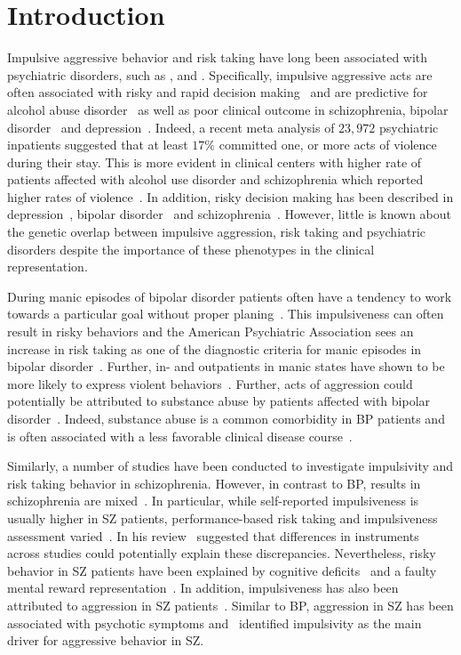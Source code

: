 \section{Introduction}
\label{sec:uk_biobank_psych_introduction}

Impulsive aggressive behavior and risk taking have long been associated with psychiatric disorders, such as ,  and .
Specifically, impulsive aggressive acts are often associated with risky and rapid decision making~\cite{Moeller2001} and are predictive for alcohol abuse disorder~\cite{Courtney2012} as well as poor clinical outcome in schizophrenia, bipolar disorder~\cite{Gut-Fayand2001} and depression~\cite{Dutton2013}.
Indeed, a recent meta analysis of $23,972$ psychiatric inpatients suggested that at least $17\%$ committed one, or more acts of violence during their stay.
This is more evident in clinical centers with higher rate of patients affected with alcohol use disorder and schizophrenia which reported higher rates of violence~\cite{Iozzino2015}. 
In addition, risky decision making has been described in depression~\cite{Wilson2010}, bipolar disorder~\cite{Johnson2012} and schizophrenia~\cite{Cheng2012}.
However, little is known about the genetic overlap between impulsive aggression, risk taking and psychiatric disorders despite the importance of these phenotypes in the clinical representation.

During manic episodes of bipolar disorder patients often have a tendency to work towards a particular goal without proper planing~\cite{Johnson2012}.
This impulsiveness can often result in risky behaviors and the American Psychiatric Association sees an increase in risk taking as one of the diagnostic criteria for manic episodes in bipolar disorder~\cite{APA1994,AmericanPsychiatricAssociation2013}.
Further, in- and outpatients in manic states have shown to be more likely to express violent behaviors~\cite{Ballester2012}.
Further, acts of aggression could potentially be attributed to substance abuse by patients affected with bipolar disorder~\cite{Fazel2010}.
Indeed, substance abuse is a common comorbidity in BP patients and is often associated with a less favorable clinical disease course~\cite{Cassidy2001}.

Similarly, a number of studies have been conducted to investigate impulsivity and risk taking behavior in schizophrenia.
However, in contrast to BP, results in schizophrenia are mixed~\cite{Reddy2014}.
In particular, while self-reported impulsiveness is usually higher in SZ patients, performance-based risk taking and impulsiveness assessment varied~\cite{Ouzir2013}.
In his review~\citet{Ouzir2013} suggested that differences in instruments across studies could potentially explain these discrepancies.
Nevertheless, risky behavior in SZ patients have been explained by cognitive deficits~\cite{Cheng2012} and a faulty mental reward representation~\cite{Heerey2011}.
In addition, impulsiveness has also been attributed to aggression in SZ patients~\cite{Hoptman2015}.
Similar to BP, aggression in SZ has been associated with psychotic symptoms and~\citet{Hoptman2015} identified impulsivity as the main driver for aggressive behavior in SZ\@.

